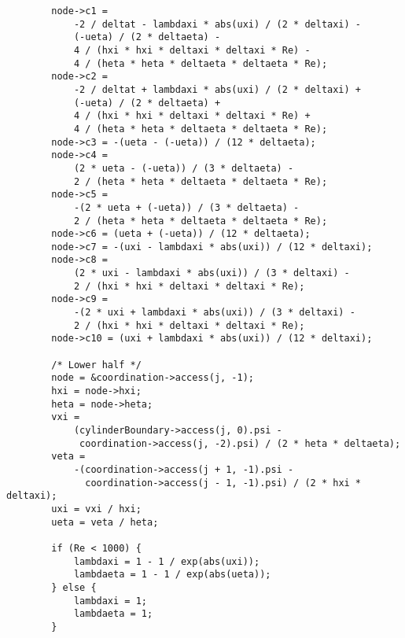 \documentclass[12pt]{article}
\begin{document}
\begin{itemize}
\begin{lstlisting}
        node->c1 =
            -2 / deltat - lambdaxi * abs(uxi) / (2 * deltaxi) -
            (-ueta) / (2 * deltaeta) -
            4 / (hxi * hxi * deltaxi * deltaxi * Re) -
            4 / (heta * heta * deltaeta * deltaeta * Re);
        node->c2 =
            -2 / deltat + lambdaxi * abs(uxi) / (2 * deltaxi) +
            (-ueta) / (2 * deltaeta) +
            4 / (hxi * hxi * deltaxi * deltaxi * Re) +
            4 / (heta * heta * deltaeta * deltaeta * Re);
        node->c3 = -(ueta - (-ueta)) / (12 * deltaeta);
        node->c4 =
            (2 * ueta - (-ueta)) / (3 * deltaeta) -
            2 / (heta * heta * deltaeta * deltaeta * Re);
        node->c5 =
            -(2 * ueta + (-ueta)) / (3 * deltaeta) -
            2 / (heta * heta * deltaeta * deltaeta * Re);
        node->c6 = (ueta + (-ueta)) / (12 * deltaeta);
        node->c7 = -(uxi - lambdaxi * abs(uxi)) / (12 * deltaxi);
        node->c8 =
            (2 * uxi - lambdaxi * abs(uxi)) / (3 * deltaxi) -
            2 / (hxi * hxi * deltaxi * deltaxi * Re);
        node->c9 =
            -(2 * uxi + lambdaxi * abs(uxi)) / (3 * deltaxi) -
            2 / (hxi * hxi * deltaxi * deltaxi * Re);
        node->c10 = (uxi + lambdaxi * abs(uxi)) / (12 * deltaxi);

        /* Lower half */
        node = &coordination->access(j, -1);
        hxi = node->hxi;
        heta = node->heta;
        vxi =
            (cylinderBoundary->access(j, 0).psi -
             coordination->access(j, -2).psi) / (2 * heta * deltaeta);
        veta =
            -(coordination->access(j + 1, -1).psi -
              coordination->access(j - 1, -1).psi) / (2 * hxi * deltaxi);
        uxi = vxi / hxi;
        ueta = veta / heta;

        if (Re < 1000) {
            lambdaxi = 1 - 1 / exp(abs(uxi));
            lambdaeta = 1 - 1 / exp(abs(ueta));
        } else {
            lambdaxi = 1;
            lambdaeta = 1;
        }


\end{lstlisting}
\end{itemize}
\end{document}
